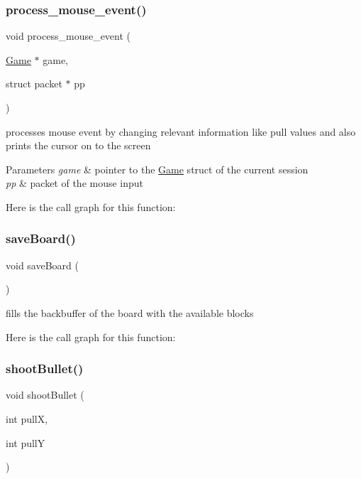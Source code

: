 \subsubsection{\texorpdfstring{process\_mouse\_event()}{process\_mouse\_event()}}
{\footnotesize\ttfamily void process\+\_\+mouse\+\_\+event (\begin{DoxyParamCaption}\item[{\mbox{\hyperlink{struct_game}{Game}} $\ast$}]{game,  }\item[{struct packet $\ast$}]{pp }\end{DoxyParamCaption})}



processes mouse event by changing relevant information like pull values and also prints the cursor on to the screen 


\begin{DoxyParams}{Parameters}
{\em game} & pointer to the \mbox{\hyperlink{struct_game}{Game}} struct of the current session \\
\hline
{\em pp} & packet of the mouse input \\
\hline
\end{DoxyParams}
Here is the call graph for this function\+:
\mbox{\label{group__game_ga0cf89070294bbf27c335ebf047e0f1f6}} 
\subsubsection{\texorpdfstring{saveBoard()}{saveBoard()}}
{\footnotesize\ttfamily void save\+Board (\begin{DoxyParamCaption}{ }\end{DoxyParamCaption})}



fills the backbuffer of the board with the available blocks 

Here is the call graph for this function\+:
\mbox{\label{group__game_ga8aa45a2e3dda0d09a4002eb399e587a9}} 
\subsubsection{\texorpdfstring{shootBullet()}{shootBullet()}}
{\footnotesize\ttfamily void shoot\+Bullet (\begin{DoxyParamCaption}\item[{int}]{pullX,  }\item[{int}]{pullY }\end{DoxyParamCaption})}



